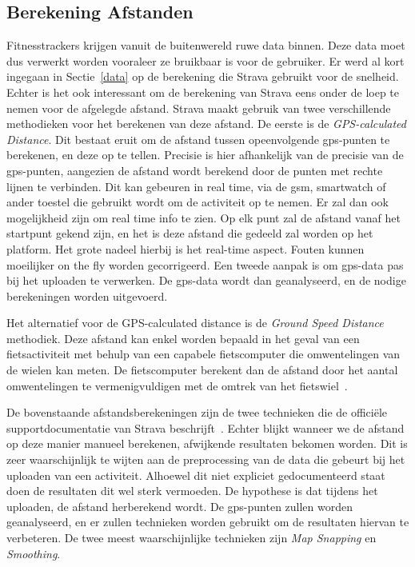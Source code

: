 \subsection{Berekening Afstanden}\label{sec:afstandsberekeningen_strava}
Fitnesstrackers krijgen vanuit de buitenwereld ruwe data binnen. Deze data moet
dus verwerkt worden vooraleer ze bruikbaar is voor de gebruiker. Er werd al
kort ingegaan in Sectie~\ref{data} op de berekening die Strava gebruikt voor de
snelheid. Echter is het ook interessant om de berekening van Strava eens onder
de loep te nemen voor de afgelegde afstand. Strava maakt gebruik van twee
verschillende methodieken voor het berekenen van deze afstand. De eerste is de
\textit{GPS-calculated Distance}. Dit bestaat eruit om de afstand tussen
opeenvolgende \ac{gps}-punten te berekenen, en deze op te tellen. Precisie is
hier afhankelijk van de precisie van de \ac{gps}-punten, aangezien de afstand
wordt berekend door de punten met rechte lijnen te verbinden. Dit kan gebeuren
in real time, via de gsm, smartwatch of ander toestel die gebruikt wordt om de
activiteit op te nemen. Er zal dan ook mogelijkheid zijn om real time info te
zien. Op elk punt zal de afstand vanaf het startpunt gekend zijn, en het is
deze afstand die gedeeld zal worden op het platform. Het grote nadeel hierbij
is het real-time aspect. Fouten kunnen moeilijker on the fly worden
gecorrigeerd. Een tweede aanpak is om \ac{gps}-data pas bij het uploaden te
verwerken. De \ac{gps}-data wordt dan geanalyseerd, en de nodige berekeningen
worden uitgevoerd.

Het alternatief voor de GPS-calculated distance is de \textit{Ground Speed
    Distance} methodiek. Deze afstand kan enkel worden bepaald in het geval van een
fietsactiviteit met behulp van een capabele fietscomputer die omwentelingen van
de wielen kan meten. De fietscomputer berekent dan de afstand door het aantal
omwentelingen te vermenigvuldigen met de omtrek van het
fietswiel~\cite{HowDista47:online}.

De bovenstaande afstandsberekeningen zijn de twee technieken die de officiële
supportdocumentatie van Strava beschrijft~\cite{HowDista47:online}. Echter
blijkt wanneer we de afstand op deze manier manueel berekenen, afwijkende
resultaten bekomen worden. Dit is zeer waarschijnlijk te wijten aan de
preprocessing van de data die gebeurt bij het uploaden van een activiteit.
Alhoewel dit niet expliciet gedocumenteerd staat doen de resultaten dit wel
sterk vermoeden. De hypothese is dat tijdens het uploaden, de afstand
herberekend wordt. De \ac{gps}-punten zullen worden geanalyseerd, en er zullen
technieken worden gebruikt om de resultaten hiervan te verbeteren. De twee
meest waarschijnlijke technieken zijn \textit{Map Snapping} en
\textit{Smoothing}.

